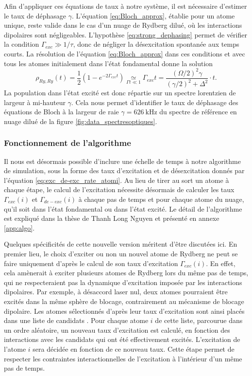Afin d'appliquer ces équations de taux à notre système, il est nécessaire d'estimer le taux de déphasage $\gamma$.
L'équation \eqref{eq:Bloch_approx}, établie pour un atome unique, reste valide dans le cas d'un nuage de Rydberg dilué, où les interactions dipolaires sont négligeables.
L'hypothèse \eqref{eq:strong_dephasing} permet de vérifier la condition $\Gamma_{exc} \gg 1/\tau$, donc de négliger la désexcitation spontanée aux temps courts.
La résolution de l'équation \eqref{eq:Bloch_approx} dans ces conditions et avec tous les atomes initialement dans l'état fondamental donne la solution 
\begin{equation}
\label{eq:Lorenztian_rhorr}
\rho_{Ry,Ry} (t) = \frac{1}{2}\left( 1-e^{-2\Gamma_{exc}t} \right)
\underset{\Gamma t \ll 1}{\simeq} \Gamma_{exc} t = \frac{(\Omega/2)^2 \gamma}{(\gamma/2)^2 + \Delta^2} \cdot t.
\end{equation}
La population dans l'état excité est donc répartie sur un spectre lorentzien de largeur à mi-hauteur $\gamma$.
Cela nous permet d'identifier le taux de déphasage des équations de Bloch à la largeur de raie $\gamma = \SI{626}{\kHz}$ du spectre de référence en nuage dilué de la figure \eqref{fig:data_spectresoptiques}.

	\subsubsection*{Fonctionnement de l'algorithme}
\noindent Il nous est désormais possible d'inclure une échelle de temps à notre algorithme de simulation, sous la forme des taux d'excitation et de désexcitation donnés par l'équation \eqref{eq:exc_de-exc_rate_atomi}.
Au lieu de tirer au sort un atome à chaque étape, le calcul de l'excitation nécessite désormais de calculer les taux $\Gamma_{exc}(i)$ et $\Gamma_{de-exc}(i)$ à chaque pas de temps et pour chaque atome du nuage, qu'il soit dans l'état fondamental ou dans l'état excité.
Le détail de l'algorithme est expliqué dans la thèse de Thanh Long Nguyen \cite{PHD_NGUYEN} et présenté en annexe \ref{app:algo}.

Quelques spécificités de cette nouvelle version méritent d'être discutées ici.
En premier lieu, le choix d'exciter ou non un nouvel atome de Rydberg ne peut se faire uniquement d'après le calcul de son taux d'excitation $\Gamma_{exc}(i)$.
En effet, cela amènerait à exciter plusieurs atomes de Rydberg lors du même pas de temps, qui ne respecteraient pas la dynamique d'excitation imposée par les interactions dipolaires.
Par exemple, à désaccord laser nul, deux atomes pourraient être excités dans la même sphère de blocage, contrairement au mécanisme de blocage dipolaire.
Les atomes sélectionnés d'après leur taux d'excitation sont ainsi placés dans une liste de \og candidats \fg{}.
Pour chaque atome $i$ de cette liste, parcourue dans un ordre aléatoire, un nouveau taux d'excitation est calculé, en fonction des interactions avec les candidats qui ont été effectivement excités.
L'excitation de l'atome $i$ sera décidée en fonction de ce nouveau taux.
Cette étape permet de respecter les contraintes interactionnelles de l'excitation à l'intérieur d'un même pas de temps.

